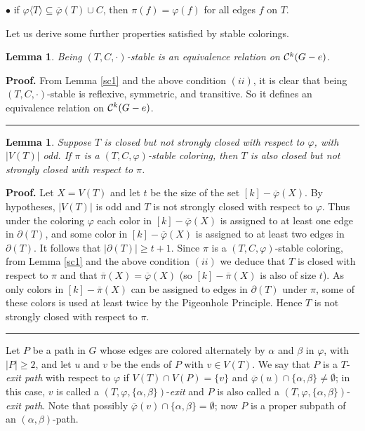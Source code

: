 \documentclass[11pt]{article}
\newtheorem{lemma}[theorem]{Lemma}
\newcommand{\phiv}{\varphi}
\def\qed{\hfill \rule{4pt}{7pt}}
\begin{document}
$\bullet$ if ${\varphi}\langle T \rangle \subseteq \overline{\varphi}(T)\cup C$, then $\pi(f) = \varphi(f)$ for all edges $f$ on $T$.    

\vskip 2mm
Let us derive some further properties satisfied by stable colorings.

\begin{lemma} \label{sc2}
Being $(T, C, \cdot )$-stable is an equivalence relation on ${\cal C}^k(G-e)$. 
\end{lemma}

{\bf Proof.} From Lemma \ref{sc1} and the above condition $(ii)$,  it is clear that being $(T, C, \cdot )$-stable is reflexive,
symmetric, and transitive. So it defines an equivalence relation on ${\cal C}^k(G-e)$. \qed 

\vskip 3mm


\begin{lemma}\label{zang1}
Suppose $T$ is closed but not strongly closed with respect to $\varphi$, with $|V(T)|$ odd. If $\pi$ is 
a $(T, C, \phiv)$-stable coloring, then $T$ is also closed but not strongly closed with respect to $\pi$.
\end{lemma}

{\bf Proof.} Let $X=V(T)$ and let $t$ be the size of the set $[k]-\overline{\varphi}(X)$. By hypotheses, $|V(T)|$ 
is odd and $T$ is not strongly closed with respect to $\varphi$. Thus under the coloring $\varphi$ each color in $[k]-
\overline {\varphi}(X)$ is assigned to at least one edge in $\partial(T)$, and some color in $[k]-\overline{\varphi}(X)$ is assigned 
to at least two edges in $\partial(T)$. It follows that $|\partial(T)|\ge t+1$. Since $\pi$ is a $(T, C, \phiv)$-stable coloring, 
from Lemma \ref{sc1} and the above condition $(ii)$ we deduce that $T$ is closed with respect to $\pi$ and that $\overline{\pi}(X)=\overline{\varphi}(X)$ 
(so $[k]-\overline{\pi}(X)$ is also of size $t$). As only colors in $[k]-\overline{\pi}(X)$ can be assigned to 
edges in $\partial(T)$ under $\pi$, some of these colors is used at least twice by the Pigeonhole Principle. Hence $T$ is not strongly 
closed with respect to $\pi$. \qed 

\vskip 3mm
Let $P$ be a path in $G$ whose edges are colored alternately by $\alpha$ and $\beta$ in $\varphi$,
with $|P|\ge 2$, and let $u$ and $v$ be the ends of $P$ with $v \in V(T)$. We say that $P$ is a $T$-{\em exit path}\label{exitpath} 
with respect to $\varphi$ if $V(T) \cap V(P)=\{v\}$ and $\overline{\varphi}(u) \cap \{\alpha,\beta\} \ne \emptyset$; 
in this case, $v$ is called a $(T,\varphi,\{\alpha,\beta\})$-{\em exit}\label{exit} and $P$ is also called a 
$(T,\varphi,\{\alpha,\beta\})$-{\em exit path}\label{tphiexitpath}. Note that possibly $\overline{\varphi}(v) \cap \{\alpha,\beta\}=\emptyset$;
now $P$ is a proper subpath of an $(\alpha,\beta)$-path.    
\end{document}
